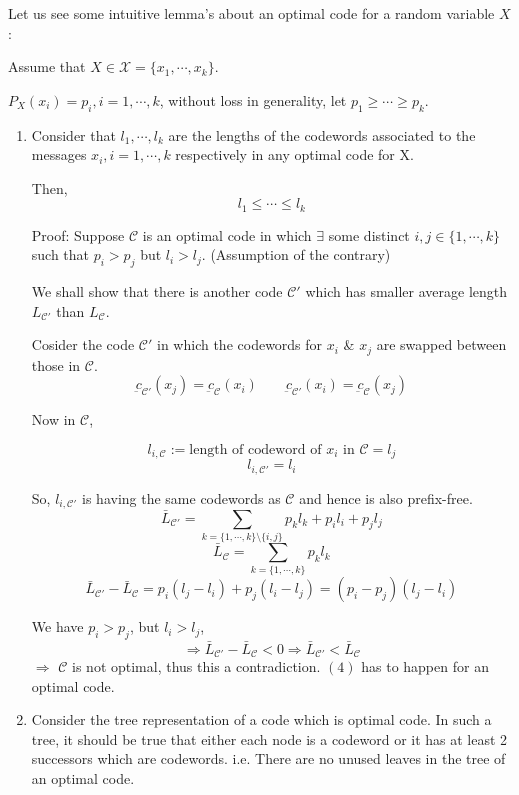 \documentclass{article}
\begin{document}
Let us see some intuitive lemma's about an optimal code for a random variable $X$:

Assume that $X \in \mathcal{X}= \{ x_1, \cdots, x_k\}$.

$P_X(x_i)= p_i, i=1, \cdots , k$, without loss in generality, let $p_1 \geq \cdots \geq p_k$.
\begin{enumerate}
    \item Consider that $l_1, \cdots, l_k$ are the lengths of the codewords associated to the messages $x_i, i=1,\cdots, k$ respectively in any optimal code for X.

    Then,
    \begin{equation}
        l_1 \leq \cdots \leq l_k
    \end{equation}

    Proof: Suppose $\mathscr{C}$ is an optimal code in which $\exists $ some distinct $i,j \in \{1,\cdots, k \}$ such that $p_i > p_j$ but $l_i > l_j$. (Assumption of the contrary)

    We shall show that there is another code $\mathscr{C}'$ which has smaller average length $L_{\mathscr{C'}}$ than $L_{\mathscr{C}}$.

    Cosider the code $\mathscr{C}'$ in which the codewords for $x_i$ \& $x_j$ are swapped between those in $\mathscr{C}$.
    $$ \underbar{c}_{\mathscr{C'}}(x_j)=\underbar{c}_{\mathscr{C}}(x_i) \qquad \underbar{c}_{\mathscr{C'}}(x_i)=\underbar{c}_{\mathscr{C}}(x_j)$$

    Now in $\mathscr{C}$,

    $$l_{i, \mathscr{C}} :=  \text{length of codeword of } x_i \text{ in }\mathscr{C}= l_j$$
$$l_{i, \mathscr{C'}}= l_i$$

So, $l_{i, \mathscr{C'}}$ is having the same codewords as $\mathscr{C}$ and hence is also prefix-free.
$$ \bar{L}_\mathscr{C'}= \sum_{k= \{ 1, \cdots, k\} \setminus \{ i,j\}}  p_k l_k+ p_i l_i + p_j l_j$$
$$ \bar{L}_\mathscr{C}= \sum_{k= \{ 1, \cdots, k\}} p_k l_k$$
$$ \bar{L}_\mathscr{C'} - \bar{L}_\mathscr{C} = p_i(l_j -l_i)+ p_j(l_i -l_j) =(p_i-p_j)(l_j -l_i) $$

We have $p_i > p_j$, but $l_i > l_j$,
$$ \Rightarrow  \bar{L}_\mathscr{C'} - \bar{L}_\mathscr{C} < 0 \Rightarrow  \bar{L}_\mathscr{C'} < \bar{L}_\mathscr{C}$$
$\Rightarrow$ $\mathscr{C}$ is not optimal, thus this a contradiction. $(4)$ has to happen for an optimal code.

\item Consider the tree representation of a code which is optimal code. In such a tree, it should be true that either each node is a codeword or it has at least 2 successors which are codewords. i.e. There are no unused leaves in the tree of an optimal code.


\end{enumerate}
\end{document}

